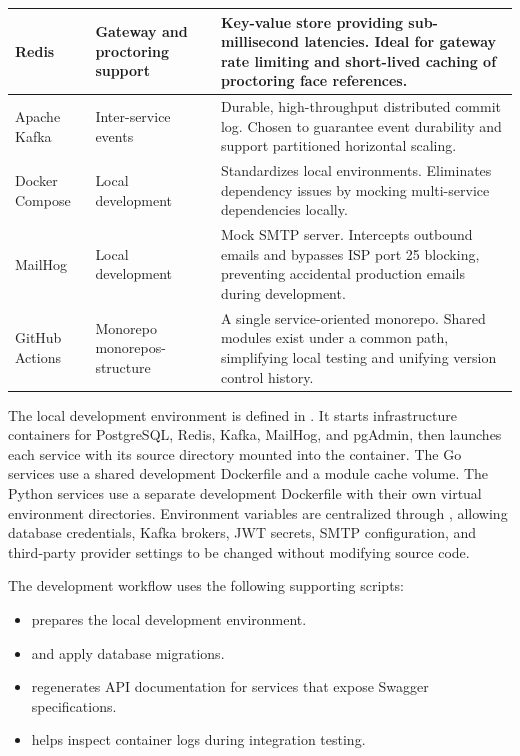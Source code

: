 \begin{longtable}{|p{2.5cm}|p{3.5cm}|p{8.5cm}|}
Redis & Gateway and proctoring support & Key-value store providing sub-millisecond latencies. Ideal for gateway rate limiting and short-lived caching of proctoring face references. \\ \hline
Apache Kafka & Inter-service events & Durable, high-throughput distributed commit log. Chosen to guarantee event durability and support partitioned horizontal scaling. \\ \hline
Docker Compose & Local development & Standardizes local environments. Eliminates dependency issues by mocking multi-service dependencies locally. \\ \hline
MailHog & Local development & Mock SMTP server. Intercepts outbound emails and bypasses ISP port 25 blocking, preventing accidental production emails during development. \\ \hline
GitHub Actions & Monorepo monorepos-structure & A single service-oriented monorepo. Shared modules exist under a common path, simplifying local testing and unifying version control history. \\ \hline
\end{longtable}

The local development environment is defined in . It starts infrastructure containers for PostgreSQL, Redis, Kafka, MailHog, and pgAdmin, then launches each service with its source directory mounted into the container. The Go services use a shared development Dockerfile and a module cache volume. The Python services use a separate development Dockerfile with their own virtual environment directories. Environment variables are centralized through , allowing database credentials, Kafka brokers, JWT secrets, SMTP configuration, and third-party provider settings to be changed without modifying source code.

The development workflow uses the following supporting scripts:

\begin{itemize}
    \item {} prepares the local development environment.
    \item {} and  apply database migrations.
    \item {} regenerates API documentation for services that expose Swagger specifications.
    \item {} helps inspect container logs during integration testing.
\end{itemize}

